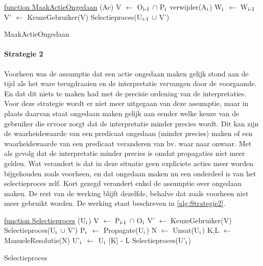 \begin{algorithm}
	\underline{function MaakActieOngedaan} (Ac)\;
	\Output{}
	V $\leftarrow$ O$\textsubscript{i-1}$ $\cap$ P$\textsubscript{i}$\;
	verwijder(A$\textsubscript{i}$)\;
	W$\textsubscript{i}$ $\leftarrow$ W$\textsubscript{i-1}$\;
		{
		V' $\leftarrow$ KeuzeGebruiker(V)\;
			{
			Selectieproces(U$\textsubscript{i-1}$ $\cup$ V')\;
			}
		}
	\caption{MaakActieOngedaan\label{alg:Strategie1b}}
\end{algorithm}

\paragraph{Strategie 2}
Voorheen was de assumptie dat een actie ongedaan maken gelijk stond aan de tijd als het ware terugdraaien en de interpretatie vervangen door de voorgaande. En dat dit niets te maken had met de precisie ordening van de interpretaties. Voor deze strategie wordt er niet meer uitgegaan van deze assumptie, maar in plaats daarvan staat ongedaan maken gelijk aan eender welke keuze van de gebruiker die ervoor zorgt dat de interpretatie minder precies wordt. Dit kan zijn de waarheidswaarde van een predicaat ongedaan (minder precies) maken of een waarheidswaarde van een predicaat veranderen van bv. waar naar onwaar. Met als gevolg dat de interpretatie minder precies is omdat propagaties niet meer gelden. Wat verandert is dat in deze situatie geen expliciete acties meer worden bijgehouden zoals voorheen, en dat ongedaan maken nu een onderdeel is van het selectieproces zelf. Kort gezegd verandert enkel de assumptie over ongedaan maken. De rest van de werking blijft dezelfde, behalve dat zoals voorheen niet meer gebruikt worden. De werking staat beschreven in \ref{alg:Strategie2}.

\begin{algorithm}
	\underline{function Selectieproces} (U$\textsubscript{i}$)\;
	\Output{}
		{
		V $\leftarrow$ P$\textsubscript{i-1}$ $\cap$ O$\textsubscript{i}$\;
			{
			V' $\leftarrow$ KeuzeGebruiker(V)\; 
			Selectieproces(U$\textsubscript{i}$ $\cup$ V')\;
			}
			{
			P$\textsubscript{i}$ $\leftarrow$ Propagate(U$\textsubscript{i}$)\;	
			}
		}
		{
		N $\leftarrow$ Unsat(U$\textsubscript{i}$)\; 
		K,L $\leftarrow$ ManueleResolutie(N)\;
		U'$\textsubscript{i}$ $\leftarrow$ U$\textsubscript{i}$ 
		[K] - L\; 
		Selectieproces(U'$\textsubscript{i}$)\;
		}
	\caption{Selectieproces\label{alg:Strategie2}}
\end{algorithm}

